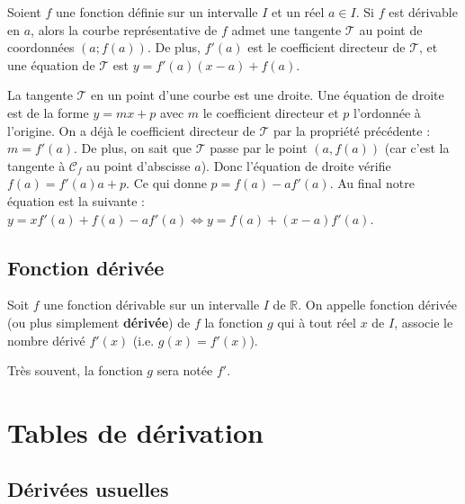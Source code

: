 	\begin{formula}
		Soient $f$ une fonction définie sur un intervalle $I$ et un réel $a \in I$. Si $f$ est dérivable en $a$, alors la courbe représentative de $f$ admet une tangente $\mathcal{T}$ au point de coordonnées $(a; f(a))$.
		\newpar
		De plus, $f'(a)$ est le coefficient directeur de $\mathcal{T}$, et une équation de $\mathcal{T}$ est $y = f'(a)(x-a)+f(a)$.
	\end{formula}


	\begin{demonstration}
		La tangente $\mathcal{T}$ en un point d'une courbe est une droite. Une équation de droite est de la forme $y = mx + p$ avec $m$ le coefficient directeur et $p$ l'ordonnée à l'origine.
		\newpar
		On a déjà le coefficient directeur de $\mathcal{T}$ par la propriété précédente : $m = f'(a)$.
		\newpar
		De plus, on sait que $\mathcal{T}$ passe par le point $(a, f(a))$ (car c'est la tangente à $\mathcal{C}_f$ au point d'abscisse $a$).
		\newpar
		Donc l'équation de droite vérifie $f(a) = f'(a)a + p$. Ce qui donne $p = f(a) - af'(a)$.
		\newline
		Au final notre équation est la suivante : $y = xf'(a) + f(a) - af'(a) \iff y = f(a) + (x - a)f'(a)$.
	\end{demonstration}

	\subsection{Fonction dérivée}

	\begin{formula}[Définition]
		Soit $f$ une fonction dérivable sur un intervalle $I$ de $\mathbb{R}$.
		\newpar
		On appelle fonction dérivée (ou plus simplement \textbf{dérivée}) de $f$ la fonction $g$ qui à tout réel $x$ de $I$, associe le nombre dérivé $f'(x)$ (i.e. $g(x) = f'(x)$).
	\end{formula}

	Très souvent, la fonction $g$ sera notée $f'$.

	\section{Tables de dérivation}

	\subsection{Dérivées usuelles}

